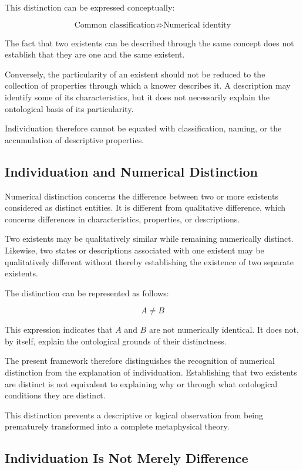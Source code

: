 This distinction can be expressed conceptually:

\[
\text{Common classification} \not\Rightarrow \text{Numerical identity}
\]

The fact that two existents can be described through the same concept does not establish that they are one and the same existent.

Conversely, the particularity of an existent should not be reduced to the collection of properties through which a knower describes it. A description may identify some of its characteristics, but it does not necessarily explain the ontological basis of its particularity.

Individuation therefore cannot be equated with classification, naming, or the accumulation of descriptive properties.

\subsection{Individuation and Numerical Distinction}

Numerical distinction concerns the difference between two or more existents considered as distinct entities. It is different from qualitative difference, which concerns differences in characteristics, properties, or descriptions.

Two existents may be qualitatively similar while remaining numerically distinct. Likewise, two states or descriptions associated with one existent may be qualitatively different without thereby establishing the existence of two separate existents.

The distinction can be represented as follows:

\[
A \neq B
\]

This expression indicates that \(A\) and \(B\) are not numerically identical. It does not, by itself, explain the ontological grounds of their distinctness.

The present framework therefore distinguishes the recognition of numerical distinction from the explanation of individuation. Establishing that two existents are distinct is not equivalent to explaining why or through what ontological conditions they are distinct.

This distinction prevents a descriptive or logical observation from being prematurely transformed into a complete metaphysical theory.

\subsection{Individuation Is Not Merely Difference}

